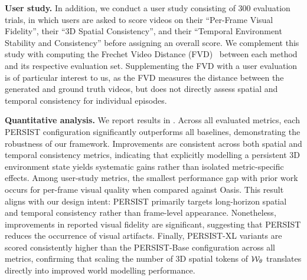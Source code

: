 \documentclass{article}
\theoremstyle{plain}
\theoremstyle{definition}
\theoremstyle{remark}
\begin{document}



\textbf{User study.} In addition, we conduct a user study consisting of 300 evaluation trials, in which users are asked to score videos on their ``Per-Frame Visual Fidelity'', their ``3D Spatial Consistency'', and their ``Temporal Environment Stability and Consistency'' before assigning an overall score. We complement this study with computing the Frechet Video Distance (FVD)~\citep{unterthiner2018towards} between each method and its respective evaluation set. Supplementing the FVD with a user evaluation is of particular interest to us, as the FVD measures the distance between the generated and ground truth videos, but does not directly assess spatial and temporal consistency for individual episodes. %

\textbf{Quantitative analysis.} We report results in . Across all evaluated metrics, each PERSIST configuration significantly outperforms all baselines, demonstrating the robustness of our framework. Improvements are consistent across both spatial and temporal consistency metrics, indicating that explicitly modelling a persistent 3D environment state yields systematic gains rather than isolated metric-specific effects. Among user-study metrics, the smallest performance gap with prior work occurs for per-frame visual quality when compared against Oasis. This result aligns with our design intent: PERSIST primarily targets long-horizon spatial and temporal consistency rather than frame-level appearance. Nonetheless, improvements in reported visual fidelity are significant, suggesting that PERSIST reduces the occurrence of visual artifacts. Finally, PERSIST-XL variants are scored consistently higher than the PERSIST-Base configuration across all metrics, confirming that scaling the number of 3D spatial tokens of ${\mathcal{W}}_\theta$ translates directly into improved world modelling performance.
\end{document}
